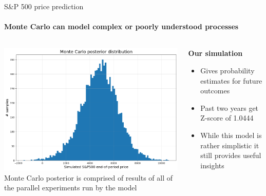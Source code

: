 \documentclass{beamer}
\begin{document}
\begin{frame}{S\&P 500 price prediction}
  \framesubtitle{Monte Carlo can model complex or poorly understood processes}
  \begin{columns}[c]
      \begin{column}{0.5\textwidth}
      \begin{center}
        \includegraphics[width=\textwidth]{images/posterior.png}
        \\[0.2cm]
        \small{Monte Carlo posterior is comprised of results of all of the parallel experiments run by the model}
      \end{center}
    \end{column}
    \begin{column}{0.5\textwidth}
      \textbf{Our simulation}
      \begin{itemize}
        \item Gives probability estimates for future outcomes
        \item Past two years get Z-score of 1.0444
        \item While this model is rather simplistic it still provides useful insights
      \end{itemize}
    \end{column}
  \end{columns}
\end{frame}
\end{document}
